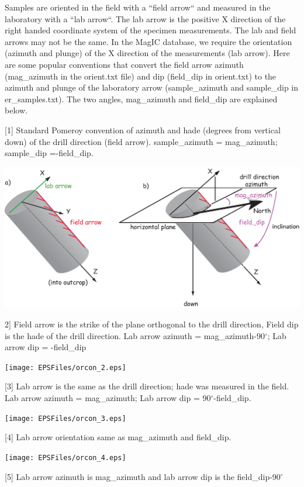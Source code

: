 \documentclass[11pt]{book}
\begin{document}
{Samples are oriented in the field with a ``field arrow`` and measured in the laboratory with a ``lab arrow``. The lab arrow is the positive X direction of the right handed coordinate system of the specimen measurements. The lab and field arrows may not be the same. In the MagIC database, we require the orientation (azimuth and plunge) of the X direction of the measurements (lab arrow). Here are some popular conventions that convert the field arrow azimuth (mag\_azimuth in the orient.txt file) and dip (field\_dip in orient.txt) to the azimuth and plunge of the laboratory arrow (sample\_azimuth and sample\_dip in er\_samples.txt). The two angles, mag\_azimuth and field\_dip are explained below.

{\parindent 0pt
[1] Standard Pomeroy convention of azimuth and hade (degrees from vertical down) of the drill direction (field arrow). sample\_azimuth = mag\_azimuth; sample\_dip =-field\_dip.

  \includegraphics[width=15cm]{EPSFiles/orcon_1.eps}

  2] Field arrow is the strike of the plane orthogonal to the drill direction, Field dip is the hade of the drill direction. Lab arrow azimuth = mag\_azimuth-90$^{\circ}$; Lab arrow dip = -field\_dip

    \texttt{[image: EPSFiles/orcon\_2.eps]}

  [3] Lab arrow is the same as the drill direction; hade was measured in the field. Lab arrow azimuth = mag\_azimuth; Lab arrow dip = 90$^{\circ}$-field\_dip.

      \texttt{[image: EPSFiles/orcon\_3.eps]}

  [4] Lab arrow orientation same as mag\_azimuth and field\_dip.

        \texttt{[image: EPSFiles/orcon\_4.eps]}

        [5]  Lab arrow azimuth is  mag\_azimuth and lab arrow dip is the  field\_dip-90$^{\circ}$

}}
\end{document}

